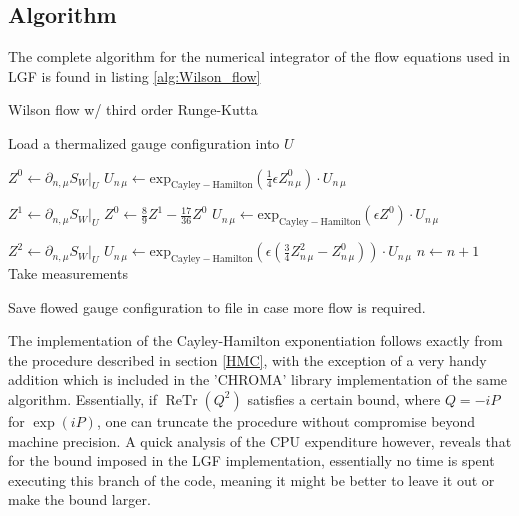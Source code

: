 \documentclass[a4paper,10pt]{book}
\begin{document}
\subsection{Algorithm}
The complete algorithm for the numerical integrator of the flow equations used in LGF is found in listing \ref{alg:Wilson_flow}
\begin{algorithm}
\caption{Wilson flow w/ third order Runge-Kutta}\label{alg:Wilson_flow}
\begin{algorithmic}
\Ensure
\State Load a thermalized gauge configuration into $U$

	\State $Z^0 \gets \partial_{n, \mu}S_W\big|_{U}$
	\State $U_{n\,\mu} \gets \operatorname{exp_{Cayley-Hamilton}}\left( \frac{1}{4}\epsilon Z^0_{n\,\mu} \right)\cdot U_{n\,\mu}$
	\EndFor
	
		\State $Z^1 \gets \partial_{n, \mu}S_W\big|_{U}$
		\State $Z^0 \gets \frac{8}{9}Z^1 -\frac{17}{36}Z^0$
	\State $U_{n\,\mu} \gets \operatorname{exp_{Cayley-Hamilton}}\left( \epsilon Z^0 \right)\cdot U_{n\,\mu}$
	\EndFor
	
		\State $Z^2 \gets \partial_{n, \mu}S_W\big|_{U}$
	\State $U_{n\,\mu} \gets \operatorname{exp_{Cayley-Hamilton}}\left( \epsilon \left( \frac{3}{4}Z^2_{n\,\mu} - Z^0_{n\,\mu} \right) \right)\cdot U_{n\,\mu}$
	\EndFor
	\State $n\gets n+1$
	\State Take measurements
\EndWhile
    
\State Save flowed gauge configuration to file in case more flow is required.

\end{algorithmic}
\end{algorithm}
The implementation of the Cayley-Hamilton exponentiation follows exactly from the procedure described in section \ref{HMC}, with the exception of a  very handy addition which is included in the 'CHROMA' library \cite{Edwards_2005} implementation of the same algorithm. Essentially, if $\operatorname{ReTr}\left( Q^2 \right)$ satisfies a certain bound, where $Q=-iP$ for $\exp(iP)$, one can truncate the procedure without compromise beyond machine precision. A quick analysis of the CPU expenditure however, reveals that for the bound imposed in the LGF implementation, essentially no time is spent executing this branch of the code, meaning it might be better to leave it out or make the bound larger.
\end{document}
